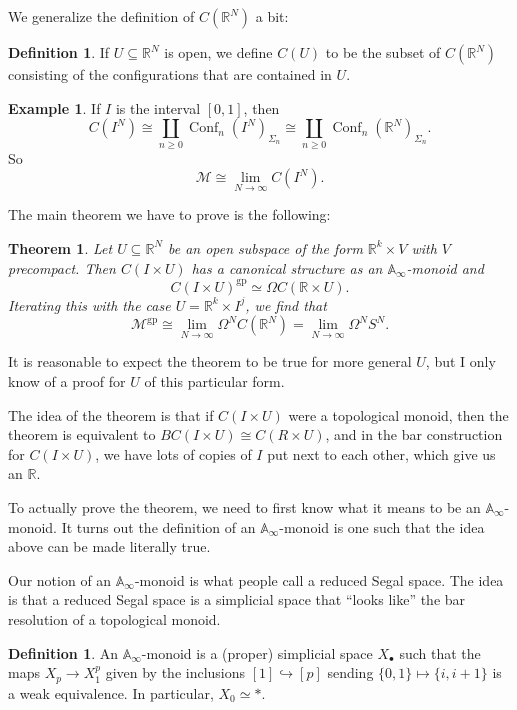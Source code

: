 \documentclass{shortart}
\newtheorem{thm}[lemma]{Theorem}
\theoremstyle{definition}
\newtheorem{defi}[lemma]{Definition}
\newtheorem{eg}[lemma]{Example}
\DeclareMathOperator\Conf{Conf}
\newcommand\A{\mathbb{A}}
\newcommand\R{\mathbb{R}}
\newcommand\gp{\mathrm{gp}}
\begin{document}
We generalize the definition of $C(\R^N)$ a bit:
\begin{defi}
  If $U \subseteq \R^N$ is open, we define $C(U)$ to be the subset of $C(\R^N)$ consisting of the configurations that are contained in $U$.
\end{defi}

\begin{eg}
  If $I$ is the interval $[0, 1]$, then
  \[
    C(I^N) \cong \coprod_{n \geq 0} \Conf_n(I^N)_{\Sigma_n} \cong \coprod_{n \geq 0} \Conf_n(\R^N)_{\Sigma_n}.
  \]
  So
  \[
    \mathcal{M} \cong \lim_{N \to \infty} C(I^N).
  \]
\end{eg}

The main theorem we have to prove is the following:
\begin{thm}
  Let $U \subseteq \R^N$ be an open subspace of the form $\R^k \times V$ with $V$ precompact. Then $C(I \times U)$ has a canonical structure as an $\A_\infty$-monoid and
  \[
    C(I \times U)^\gp \simeq \Omega C(\R \times U).
  \]
  Iterating this with the case $U = \R^k \times I^j$, we find that
  \[
    \mathcal{M}^{\gp} \cong \lim_{N \to \infty} \Omega^N C(\R^N) = \lim_{N \to \infty} \Omega^N S^N.
  \]
\end{thm}
It is reasonable to expect the theorem to be true for more general $U$, but I only know of a proof for $U$ of this particular form.

The idea of the theorem is that if $C(I \times U)$ were a topological monoid, then the theorem is equivalent to $B C(I \times U) \cong C(R \times U)$, and in the bar construction for $C(I \times U)$, we have lots of copies of $I$ put next to each other, which give us an $\R$.

To actually prove the theorem, we need to first know what it means to be an $\A_\infty$-monoid. It turns out the definition of an $\A_\infty$-monoid is one such that the idea above can be made literally true.

Our notion of an $\A_\infty$-monoid is what people call a reduced Segal space. The idea is that a reduced Segal space is a simplicial space that ``looks like'' the bar resolution of a topological monoid.

\begin{defi}
  An $\A_\infty$-monoid is a (proper) simplicial space $X_\bullet$ such that the maps $X_p \to X_1^p$ given by the inclusions $[1] \hookrightarrow [p]$ sending $\{0, 1\} \mapsto \{i, i + 1\}$ is a weak equivalence. In particular, $X_0 \simeq *$.
\end{defi}
\end{document}
